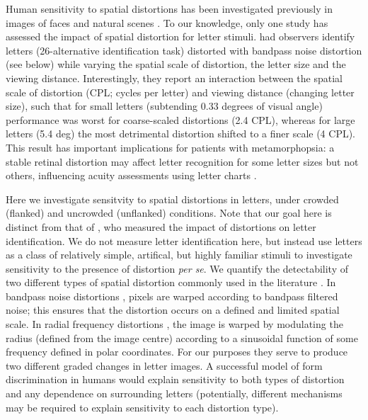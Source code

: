 \documentclass[doc, 11pt,a4paper,natbib]{apa6}\usepackage[]{graphicx}\usepackage[]{color}
\begin{document}
Human sensitivity to spatial distortions has been investigated previously in images of faces \citep{spence_why_2014,rovamo_detection_1997,dickinson_global_2010,hole_effects_2002} and natural scenes \citep{kingdom_does_2007,bex_sensitivity_2010}.
To our knowledge, only one study has assessed the impact of spatial distortion for letter stimuli.
\citet{wiecek_metamorphopsia_2014} had observers identify letters (26-alternative identification task) distorted with bandpass noise distortion (see below) while varying the spatial scale of distortion, the letter size and the viewing distance.
Interestingly, they report an interaction between the spatial scale of distortion (CPL; cycles per letter) and viewing distance (changing letter size), such that for small letters (subtending 0.33 degrees of visual angle) performance was worst for coarse-scaled distortions (2.4 CPL), whereas for large letters (5.4 deg) the most detrimental distortion shifted to a finer scale (4 CPL).
This result has important implications for patients with metamorphopsia: a stable retinal distortion may affect letter recognition for some letter sizes but not others, influencing acuity assessments using letter charts \citep[a primary outcome measure for clinical vision assessment;][]{wiecek_metamorphopsia_2014}.

Here we investigate sensitvity to spatial distortions in letters, under crowded (flanked) and uncrowded (unflanked) conditions.
Note that our goal here is distinct from that of \citet{wiecek_metamorphopsia_2014}, who measured the impact of distortions on letter identification.
We do not measure letter identification here, but instead use letters as a class of relatively simple, artifical, but highly familiar stimuli to investigate sensitivity to the presence of distortion \textit{per se}.
We quantify the detectability of two different types of spatial distortion commonly used in the literature \citep[see also][for another distortion not employed here]{stojanoski_time_2014}.
In bandpass noise distortions \citep[hereafter referred to as \textit{BPN} distortion;][]{bex_sensitivity_2010}, pixels are warped according to bandpass filtered noise; this ensures that the distortion occurs on a defined and limited spatial scale.
In radial frequency distortions \citep[hereafter referred to as \textit{RF} distortion;][]{wilkinson_detection_1998, dickinson_global_2010}, the image is warped by modulating the radius (defined from the image centre) according to a sinusoidal function of some frequency defined in polar coordinates.
For our purposes they serve to produce two different graded changes in letter images.
A successful model of form discrimination in humans would explain sensitivity to both types of distortion and any dependence on surrounding letters (potentially, different mechanisms may be required to explain sensitivity to each distortion type).
\end{document}
